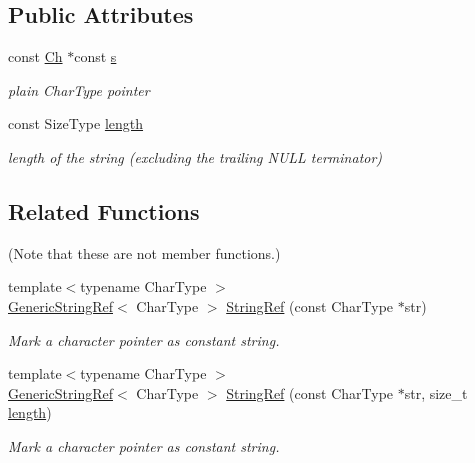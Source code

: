 \subsection*{Public Attributes}
\begin{DoxyCompactItemize}
\item 
\mbox{\label{structGenericStringRef_aec7a5900ea6f3e42f0ea8403d5135103}} 
const \hyperlink{structGenericStringRef_a16908c3fce41be380061330c14ba2140}{Ch} $\ast$const \hyperlink{structGenericStringRef_aec7a5900ea6f3e42f0ea8403d5135103}{s}
\begin{DoxyCompactList}\small\item\em plain Char\+Type pointer \end{DoxyCompactList}\item 
\mbox{\label{structGenericStringRef_a4a96d618744ad73f766a1551b1d517fe}} 
const Size\+Type \hyperlink{structGenericStringRef_a4a96d618744ad73f766a1551b1d517fe}{length}
\begin{DoxyCompactList}\small\item\em length of the string (excluding the trailing N\+U\+LL terminator) \end{DoxyCompactList}\end{DoxyCompactItemize}
\subsection*{Related Functions}
(Note that these are not member functions.) \begin{DoxyCompactItemize}
\item 
{\footnotesize template$<$typename Char\+Type $>$ }\\\hyperlink{structGenericStringRef}{Generic\+String\+Ref}$<$ Char\+Type $>$ \hyperlink{structGenericStringRef_aa6b9fd9f6aa49405a574c362ba9af6b5}{String\+Ref} (const Char\+Type $\ast$str)
\begin{DoxyCompactList}\small\item\em Mark a character pointer as constant string. \end{DoxyCompactList}\item 
{\footnotesize template$<$typename Char\+Type $>$ }\\\hyperlink{structGenericStringRef}{Generic\+String\+Ref}$<$ Char\+Type $>$ \hyperlink{structGenericStringRef_a578c51ab574a50a9c760b9da7c7562f2}{String\+Ref} (const Char\+Type $\ast$str, size\+\_\+t \hyperlink{structGenericStringRef_a4a96d618744ad73f766a1551b1d517fe}{length})
\begin{DoxyCompactList}\small\item\em Mark a character pointer as constant string. \end{DoxyCompactList}\end{DoxyCompactItemize}


